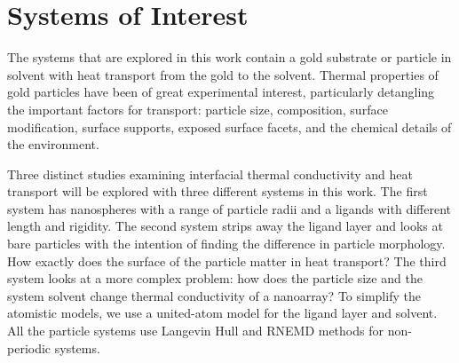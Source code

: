 \section{Systems of Interest}
The systems that are explored in this work contain a gold substrate or particle in solvent with heat transport from the gold to the solvent. 
Thermal properties of gold particles have been of great experimental interest, particularly detangling the important factors for transport: particle size,\cite{Zanjani2014,Liu2015,Wilhelmsen2015,Stocker2016,Tascini2016} composition,\cite{Wilson:2002uq, Ong:2013rt} surface modification,\cite{kuang:AuThl,Ong:2013rt,Ong:2014yq,Liu2015,Stocker2016,Hannah2015,Park2016,Leitner2017} surface supports,\cite{Park2012} exposed surface facets,\cite{Hannah2015} and the chemical details of the environment.\cite{Ge2006,Park2012,Ong:2013rt,Ong:2014yq,Wilhelmsen2015,Park2016} 

Three distinct studies examining interfacial thermal conductivity and heat transport will be explored with three different systems in this work.
The first system has nanospheres with a range of particle radii and a ligands with different length and rigidity.\cite{Stocker2016}
The second system strips away the ligand layer and looks at bare particles with the intention of finding the difference in particle morphology.\cite{Neidhart}
How exactly does the surface of the particle matter in heat transport?
The third system looks at a more complex problem: how does the particle size and the system solvent change thermal conductivity of a nanoarray?
To simplify the atomistic models, we use a united-atom model for the ligand layer and solvent.
All the particle systems use Langevin Hull\cite{Vardeman2011} and RNEMD methods for non-periodic systems.\cite{Stocker:2014qq}
